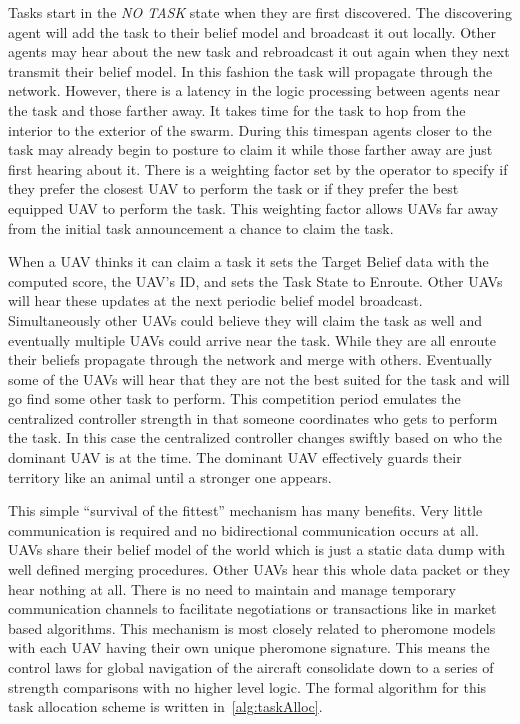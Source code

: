 Tasks start in the \textit{NO TASK} state when they are first discovered.  The discovering agent will add the task to their belief model and broadcast it out locally.  Other agents may hear about the new task and rebroadcast it out again when they next transmit their belief model.  In this fashion the task will propagate through the network.  However, there is a latency in the logic processing between agents near the task and those farther away.  It takes time for the task to hop from the interior to the exterior of the swarm.  During this timespan agents closer to the task may already begin to posture to claim it while those farther away are just first hearing about it.  There is a weighting factor set by the operator to specify if they prefer the closest UAV to perform the task or if they prefer the best equipped UAV to perform the task.  This weighting factor allows UAVs far away from the initial task announcement a chance to claim the task.

When a UAV thinks it can claim a task it sets the Target Belief data with the computed score, the UAV's ID, and sets the Task State to Enroute.  Other UAVs will hear these updates at the next periodic belief model broadcast.  Simultaneously other UAVs could believe they will claim the task as well and eventually multiple UAVs could arrive near the task.  While they are all enroute their beliefs propagate through the network and merge with others.  Eventually some of the UAVs will hear that they are not the best suited for the task and will go find some other task to perform.  This competition period emulates the centralized controller strength in that someone coordinates who gets to perform the task.  In this case the centralized controller changes swiftly based on who the dominant UAV is at the time.  The dominant UAV effectively guards their territory like an animal until a stronger one appears.

This simple ``survival of the fittest'' mechanism has many benefits.  Very little communication is required and no bidirectional communication occurs at all.  UAVs share their belief model of the world which is just a static data dump with well defined merging procedures.  Other UAVs hear this whole data packet or they hear nothing at all.  There is no need to maintain and manage temporary communication channels to facilitate negotiations or transactions like in market based algorithms.  This mechanism is most closely related to pheromone models with each UAV having their own unique pheromone signature.  This means the control laws for global navigation of the aircraft consolidate down to a series of strength comparisons with no higher level logic.  The formal algorithm for this task allocation scheme is written in~\ref{alg:taskAlloc}.
